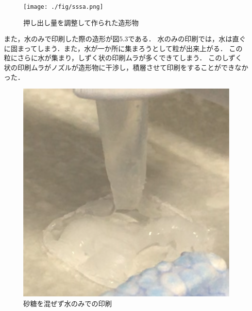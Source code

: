   \begin{figure}[H]
    \centering
    \texttt{[image: ./fig/sssa.png]}
    \caption{押し出し量を調整して作られた造形物}
    \label{fig:printer2}
  \end{figure}

また，水のみで印刷した際の造形が図5.3である．
水のみの印刷では，水は直ぐに固まってしまう．また，水が一か所に集まろうとして粒が出来上がる．
この粒にさらに水が集まり，しずく状の印刷ムラが多くできてしまう．
このしずく状の印刷ムラがノズルが造形物に干渉し，積層させて印刷をすることができなかった．

\begin{figure}[H]
    \centering
    \includegraphics[width=8truecm]{./fig/mizu.png}
    \caption{砂糖を混ぜず水のみでの印刷}
    \label{fig:printer2}
  \end{figure}




